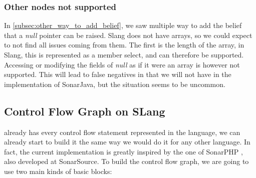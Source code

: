 \subsubsection{Other nodes not supported}
\label{subsubsec:other_nodes_not_supported}

In \ref{subsec:other_way_to_add_belief}, we saw multiple way to add the belief that a \emph{null} pointer can be raised. 
Slang does not have arrays, so we could expect to not find all issues coming from them. 
The first is the length of the array, in Slang, this is represented as a member select, and can therefore be supported.
Accessing or modifying the fields of \emph{null} as if it were an array is however not supported. 
This will lead to false negatives in \slang{} that we will not have in the implementation of SonarJava, but the situation seems to be uncommon.

\subsection{Control Flow Graph on SLang}
\label{subsec:cfg_on_slang}

\slang{} already has every control flow statement represented in the language, we can already start to build it the same way we would do it for any other language. 
In fact, the current implementation is greatly inspired by the one of SonarPHP \cite{SonarPHP:2019:Online}, also developed at SonarSource.
To build the control flow graph, we are going to use two main kinds of basic blocks:

